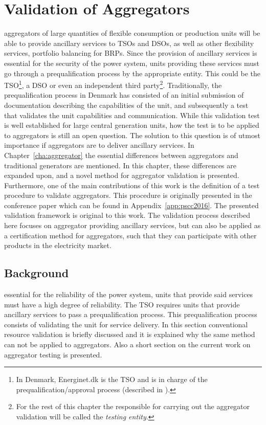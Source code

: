 \chapter{Validation of Aggregators}
\label{cha:validation}
 aggregators of large quantities of flexible consumption or production units will be able to provide ancillary services to TSOs and DSOs, as well as other flexibility services, \eg portfolio balancing for BRPs. Since the provision of ancillary services is essential for the security of the power system, units providing these services must go through a prequalification process by the appropriate entity. This could be the TSO\footnote{In Denmark, Energinet.dk is the TSO and is in charge of the prequalification/approval process (described in \cite{EnerginetAncillary}).}, a DSO or even an independent third party\footnote{For the rest of this chapter the responsible for carrying out the aggregator validation will be called the \emph{testing entity}.}. Traditionally, the prequalification process in Denmark has consisted of an initial submission of documentation describing the capabilities of the unit, and subsequently a test that validates the unit capabilities and communication. While this validation test is well established for large central generation units, how the test is to be applied to aggregators is still an open question. The solution to this question is of utmost importance if aggregators are to deliver ancillary services. In Chapter~\ref{cha:aggregator} the essential differences between aggregators and traditional generators are mentioned. In this chapter, these differences are expanded upon, and a novel method for aggregator validation is presented. Furthermore, one of the main contributions of this work is the definition of a test procedure to validate aggregators. This procedure is originally presented in the conference paper which can be found in Appendix~\ref{app:pscc2016}. The presented validation framework is original to this work. The validation process described here focuses on aggregator providing ancillary services, but can also be applied as a certification method for aggregators, such that they can participate with other products in the electricity market.

\section{Background}
 essential for the reliability of the power system, units that provide said services must have a high degree of reliability. The TSO requires units that provide ancillary services to pass a prequalification process. This prequalification process consists of validating the unit for service delivery. In this section conventional resource validation is briefly discussed and it is explained why the same method can not be applied to aggregators. Also a short section on the current work on aggregator testing is presented.
